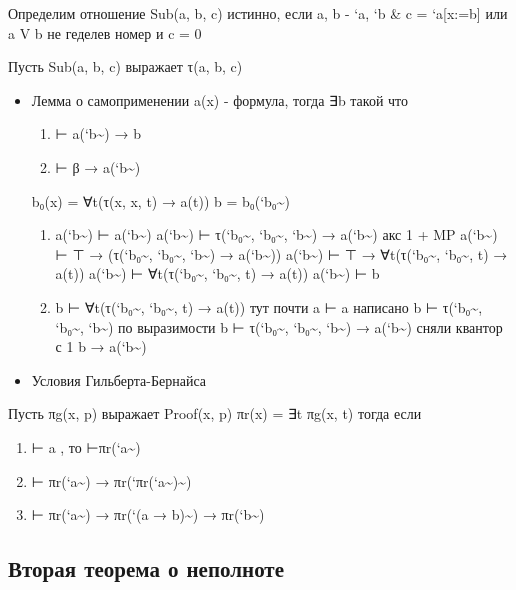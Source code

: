 \documentclass[11pt]{article}
\begin{document}
Определим отношение Sub(a, b, c) истинно, если
a, b - `a, `b \& c = `a[x:=b] или
a V b не геделев номер и c = 0

Пусть Sub(a, b, c) выражает τ(a, b, c)

\begin{itemize}
\item Лемма о самоприменении
a(x) - формула, тогда ∃b такой что
\begin{enumerate}
\item ⊢ a(`b\textasciitilde{}) → b
\item ⊢ β → a(`b\textasciitilde{})
\end{enumerate}
b₀(x) = ∀t(τ(x, x, t) → a(t))
b = b₀(`b₀\textasciitilde{})
\begin{enumerate}
\item a(`b\textasciitilde{}) ⊢ a(`b\textasciitilde{})
a(`b\textasciitilde{}) ⊢ τ(`b₀\textasciitilde{}, `b₀\textasciitilde{}, `b\textasciitilde{}) → a(`b\textasciitilde{})    акс 1 + MP
a(`b\textasciitilde{}) ⊢ ⊤ → (τ(`b₀\textasciitilde{}, `b₀\textasciitilde{}, `b\textasciitilde{}) → a(`b\textasciitilde{}))
a(`b\textasciitilde{}) ⊢ ⊤ → ∀t(τ(`b₀\textasciitilde{}, `b₀\textasciitilde{}, t) → a(t))
a(`b\textasciitilde{}) ⊢ ∀t(τ(`b₀\textasciitilde{}, `b₀\textasciitilde{}, t) → a(t))
a(`b\textasciitilde{}) ⊢ b
\item b ⊢ ∀t(τ(`b₀\textasciitilde{}, `b₀\textasciitilde{}, t) → a(t))    тут почти a ⊢ a написано
b ⊢ τ(`b₀\textasciitilde{}, `b₀\textasciitilde{}, `b\textasciitilde{})             по выразимости
b ⊢ τ(`b₀\textasciitilde{}, `b₀\textasciitilde{}, `b\textasciitilde{}) → a(`b\textasciitilde{})    сняли квантор с 1
b → a(`b\textasciitilde{})
\end{enumerate}

\item Условия Гильберта-Бернайса
\end{itemize}
Пусть πg(x, p) выражает Proof(x, p)
πr(x) = ∃t πg(x, t) тогда если
\begin{enumerate}
\item ⊢ a , то ⊢πr(`a\textasciitilde{})
\item ⊢ πr(`a\textasciitilde{}) → πr(`πr(`a\textasciitilde{})\textasciitilde{})
\item ⊢ πr(`a\textasciitilde{}) → πr(`(a → b)\textasciitilde{}) → πr(`b\textasciitilde{})
\end{enumerate}
\subsection{Вторая теорема о неполноте}
\label{sec-14-2}
\end{document}

